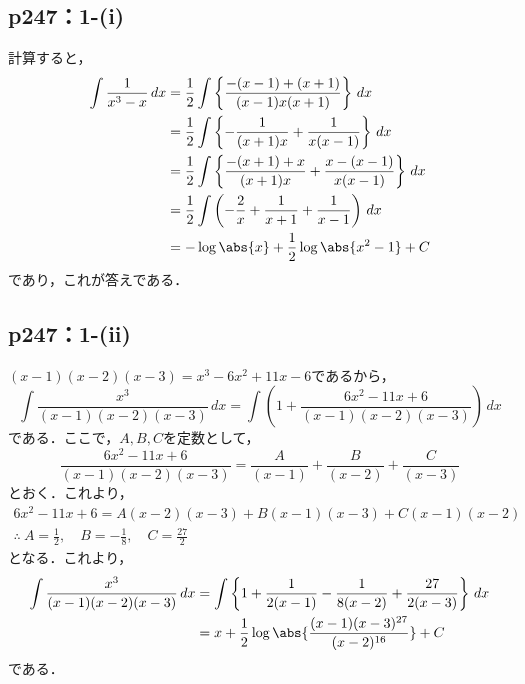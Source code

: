 \documentclass[a4paper,10pt,fleqn]{ltjsarticle}
\begin{document}
\subsection*{p247：1-(i)}

\begin{tleftbar}
    計算すると，
    \begin{align*}
        \int \frac{1}{x^3-x} \, dx & = \frac{1}{2} \int \left \{ \frac{-(x-1)+(x+1)}{(x-1)x(x+1)} \right \} \, dx \\
        & = \frac{1}{2} \int \left \{ -\frac{1}{(x+1)x}+\frac{1}{x(x-1)} \right \} \, dx \\
        & = \frac{1}{2} \int \left \{ \frac{-(x+1)+x}{(x+1)x} + \frac{x-(x-1)}{x(x-1)} \right \} \, dx \\
        & = \frac{1}{2} \int \left ( -\frac{2}{x}+\frac{1}{x+1}+\frac{1}{x-1} \right) \, dx \\
        & = -\log \abs{x} + \frac{1}{2} \log \abs{x^2-1}+ C
    \end{align*}
    であり，これが答えである．
\end{tleftbar}


\subsection*{p247：1-(ii)}

\begin{tleftbar}
    $(x-1)(x-2)(x-3)=x^3 -6x^2+11x-6$であるから，
    \[
        \int \frac{x^3}{(x-1)(x-2)(x-3)} \, dx  = \int \left (1+ \frac{6x^2-11x+6}{(x-1)(x-2)(x-3)}\right) \, dx
    \]
    である．ここで，$A,B,C$を定数として，
    \[
        \frac{6x^2-11x+6}{(x-1)(x-2)(x-3)} = \frac{A}{(x-1)}+\frac{B}{(x-2)}+\frac{C}{(x-3)}
    \]
    とおく．これより，
    \begin{gather*}
        6x^2-11x+6 = A(x-2)(x-3)+B (x-1)(x-3)+C(x-1)(x-2) \\
        \therefore ~ A = \frac{1}{2}, \quad B = -\frac{1}{8},\quad C= \frac{27}{2}
    \end{gather*}
    となる．これより，
    \begin{align*}
        \int \frac{x^3}{(x-1)(x-2)(x-3)} \, dx & = \int \left \{ 1+ \frac{1}{2(x-1)} - \frac{1}{8(x-2)}+\frac{27}{2(x-3)} \right \} \, dx  \\
        & = x + \frac{1}{2} \log \abs{\frac{(x-1)(x-3)^{27}}{(x-2)^{16}}}+C
    \end{align*}
    である．
\end{tleftbar}
\end{document}

